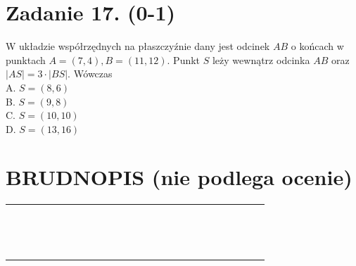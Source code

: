 \documentclass[10pt]{article}
\begin{document}
\section*{Zadanie 17. (0-1)}
W układzie współrzędnych na płaszczyźnie dany jest odcinek \(A B\) o końcach w punktach \(A=(7,4), B=(11,12)\). Punkt \(S\) leży wewnątrz odcinka \(A B\) oraz \(|A S|=3 \cdot|B S|\). Wówczas\\
A. \(S=(8,6)\)\\
B. \(S=(9,8)\)\\
C. \(S=(10,10)\)\\
D. \(S=(13,16)\)

\section*{BRUDNOPIS (nie podlega ocenie)}
\begin{center}
\begin{tabular}{|c|c|c|c|c|c|c|c|c|c|c|c|c|c|c|c|c|c|c|c|c|c|c|}
\hline
 &  &  &  &  &  &  &  &  &  &  &  &  &  &  &  &  &  &  &  &  &  &  \\
\hline
 &  &  &  &  &  &  &  &  &  &  &  &  &  &  &  &  &  &  &  &  &  &  \\
\hline
 &  &  &  &  &  &  &  &  &  &  &  &  &  &  &  &  &  &  &  &  &  &  \\
\hline
 &  &  &  &  &  &  &  &  &  &  &  &  &  &  &  &  &  &  &  &  &  &  \\
\hline
 &  &  &  &  &  &  &  &  &  &  &  &  &  &  &  &  &  &  &  &  &  &  \\
\hline
 &  &  &  &  &  &  &  &  &  &  &  &  &  &  &  &  &  &  &  &  &  &  \\
\hline
 &  &  &  &  &  &  &  &  &  &  &  &  &  &  &  &  &  &  &  &  &  &  \\
\hline
 &  &  &  &  &  &  &  &  &  &  &  &  &  &  &  &  &  &  &  &  &  &  \\
\hline
 &  &  &  &  &  &  &  &  &  &  &  &  &  &  &  &  &  &  &  &  &  &  \\
\hline
 &  &  &  &  &  &  &  &  &  &  &  &  &  &  &  &  &  &  &  &  &  &  \\
\hline
 &  &  &  &  &  &  &  &  &  &  &  &  &  &  &  &  &  &  &  &  &  &  \\
\hline
 &  &  &  &  &  &  &  &  &  &  &  &  &  &  &  &  &  &  &  &  &  &  \\
\hline
 &  &  &  &  &  &  &  &  &  &  &  &  &  &  &  &  &  &  &  &  &  &  \\
\hline
 &  &  &  &  &  &  &  &  &  &  &  &  &  &  &  &  &  &  &  &  &  &  \\

\end{tabular}
\end{center}
\end{document}
